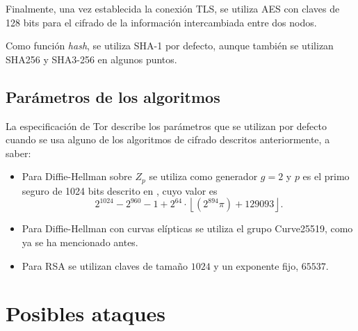 \documentclass[
  a4paper,
  12pt,
  spanish,
]{scrartcl}
\begin{document}
Finalmente, una vez establecida la conexión TLS, se utiliza AES con claves de 128 bits para el cifrado de la información intercambiada entre dos nodos.

Como función \textit{hash}, se utiliza SHA-1 por defecto, aunque también se utilizan SHA256 y SHA3-256 en algunos puntos.

\subsection{Parámetros de los algoritmos}

La especificación de Tor describe los parámetros que se utilizan por defecto cuando se usa alguno de los algoritmos de cifrado descritos anteriormente, a saber: \begin{itemize}
  \item Para Diffie-Hellman sobre \(Z_p\) se utiliza como generador \(g=2\) y \(p\) es el primo seguro de 1024 bits descrito en \parencite{carrel_internet_1998}, cuyo valor es \[
    2^{1024} - 2^{960} - 1 + 2^{64} \cdot \left\lfloor (2^{894} \pi) + 129093 \right\rfloor.
  \] 
  \item Para Diffie-Hellman con curvas elípticas se utiliza el grupo Curve25519, como ya se ha mencionado antes.
  \item Para RSA se utilizan claves de tamaño \(1024\) y un exponente fijo, \(65537\).
\end{itemize}

\section{Posibles ataques}



\newpage
\printbibliography
\end{document}
